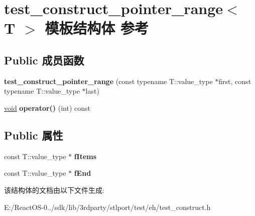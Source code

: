 \hypertarget{structtest__construct__pointer__range}{}\section{test\+\_\+construct\+\_\+pointer\+\_\+range$<$ T $>$ 模板结构体 参考}
\label{structtest__construct__pointer__range}
\subsection*{Public 成员函数}
\begin{DoxyCompactItemize}
\item 
\mbox{\label{structtest__construct__pointer__range_ab36e7d7c56e42a1a8f2a6af4c12baef0}} 
{\bfseries test\+\_\+construct\+\_\+pointer\+\_\+range} (const typename T\+::value\+\_\+type $\ast$first, const typename T\+::value\+\_\+type $\ast$last)
\item 
\mbox{\label{structtest__construct__pointer__range_a9be07ad2ee671bfc7d3386ce44a6a2e0}} 
\hyperlink{interfacevoid}{void} {\bfseries operator()} (int) const
\end{DoxyCompactItemize}
\subsection*{Public 属性}
\begin{DoxyCompactItemize}
\item 
\mbox{\label{structtest__construct__pointer__range_a934cfcc6cbd36bff8562f4345ead6c2e}} 
const T\+::value\+\_\+type $\ast$ {\bfseries f\+Items}
\item 
\mbox{\label{structtest__construct__pointer__range_a71c0d50595a13ff30e798e22388a3068}} 
const T\+::value\+\_\+type $\ast$ {\bfseries f\+End}
\end{DoxyCompactItemize}


该结构体的文档由以下文件生成\+:\begin{DoxyCompactItemize}
\item 
E\+:/\+React\+O\+S-\/0../sdk/lib/3rdparty/stlport/test/eh/test\+\_\+construct.\+h\end{DoxyCompactItemize}
